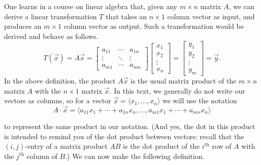 One learns in a course on linear algebra that, given any $m\times n$ matrix $A$, we can derive a linear transformation $T$ that takes an $n\times 1$ column vector as input, and produces an $m\times 1$ column vector as output.  Such a transformation would be derived and behave as follows.
\[
T(\vec{x}) = A\vec{x} = 
	\begin{bmatrix} 
		a_{11} & \cdots & a_{1n}\\
		\vdots & \ddots & \vdots \\
		a_{m1} & \cdots & a_{mn}
	\end{bmatrix}
	\begin{bmatrix}x_1\\x_2\\ \vdots\\x_n\end{bmatrix}
	 = \begin{bmatrix}y_1\\y_2\\ \vdots \\y_m\end{bmatrix}=\vec{y}.
\]
In the above definition, the product $A\vec{x}$ is the usual matrix product of the $m\times n$ matrix $A$ with the $n\times 1$ matrix $\vec{x}$. In this text, we generally do not write our vectors as columns, so for a vector $\vec{x}=\langle x_1,\ldots, x_n\rangle$ we will use the notation
\[
A\cdot \vec{x} =\langle a_{11}x_1+\cdots + a_{1n}x_n, \ldots, a_{m1}x_1+\cdots +a_{mn}x_n\rangle
\]

to represent the same product in our notation. (And yes, the dot in this product is intended to remind you of the dot product between vectors: recall that the $(i,j)$-entry of a matrix product $AB$ is the dot product of the $i^{\text{th}}$ row of $A$ with the $j^{\text{th}}$ column of $B$.) We can now make the following definition.


\\

